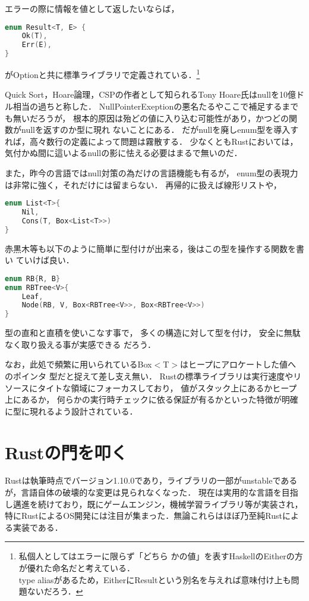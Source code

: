 エラーの際に情報を値として返したいならば，
\begin{lstlisting}[language={C++},caption=Result型,label=result_t]
enum Result<T, E> {
    Ok(T),
    Err(E),
}
\end{lstlisting}
がOptionと共に標準ライブラリで定義されている．\footnote{私個人としてはエラーに限らず「どちら
  かの値」を表すHaskellのEitherの方が優れた命名だと考えている． \\
  type aliasがあるため，EitherにResultという別名を与えれば意味付け上も問題ないだろう．}

Quick Sort，Hoare論理，CSPの作者として知られるTony Hoare氏はnullを10億ドル相当の過ちと称した．
NullPointerExeptionの悪名たるやここで補足するまでも無いだろうが，
根本的原因は殆どの値に入り込む可能性があり，かつどの関数がnullを返すのか型に現れ
ないことにある．
だがnullを廃しenum型を導入すれば，高々数行の定義によって問題は霧散する．
少なくともRustにおいては，気付かぬ間に這いよるnullの影に怯える必要はまるで無いのだ．

また，昨今の言語ではnull対策の為だけの言語機能も有るが，
enum型の表現力は非常に強く，それだけには留まらない．
再帰的に扱えば線形リストや，
\begin{lstlisting}[language={C++},caption=線形リスト,label=list_t]
enum List<T>{
    Nil,
    Cons(T, Box<List<T>>)
}
\end{lstlisting}
赤黒木等も以下のように簡単に型付けが出来る，後はこの型を操作する関数を書い
ていけば良い．
\begin{lstlisting}[language={C++},caption=赤黒木,label=abt_t]
enum RB{R, B}
enum RBTree<V>{
    Leaf,
    Node(RB, V, Box<RBTree<V>>, Box<RBTree<V>>)
}
\end{lstlisting}

型の直和と直積を使いこなす事で，
多くの構造に対して型を付け，
安全に無駄なく取り扱える事が実感できる
だろう．

なお，此処で頻繁に用いられているBox$<$T$>$はヒープにアロケートした値へのポインタ
型だと捉えて差し支え無い．
Rustの標準ライブラリは実行速度やリソースにタイトな領域にフォーカスしており，
値がスタック上にあるかヒープ上にあるか，
何らかの実行時チェックに依る保証が有るかといった特徴が明確に型に現れるよう設計されている．


\section{Rustの門を叩く}
Rustは執筆時点でバージョン1.10.0であり，ライブラリの一部がunstableであるが，言語自体の破壊的な変更は見られなくなった．
現在は実用的な言語を目指し邁進を続けており，既にゲームエンジン，機械学習ライブラリ等が実装され，
特にRustによるOS開発\cite{redox}には注目が集まった．無論これらはほぼ乃至純Rustによる実装である．

